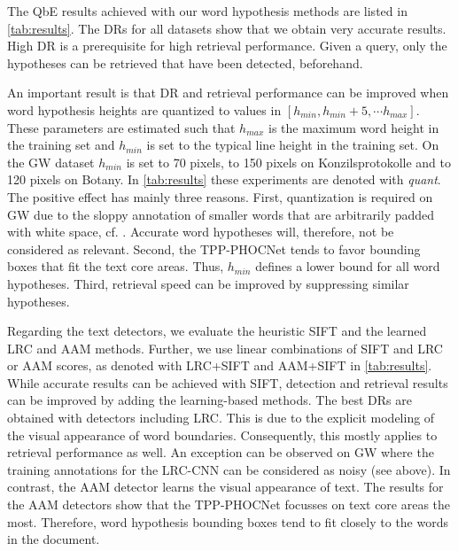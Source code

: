 The QbE results achieved with our word hypothesis methods are listed 
in \autoref{tab:results}. The DRs for all datasets show that we obtain very accurate
results.
High DR is a prerequisite for high retrieval performance. 
Given a query, only the hypotheses can be retrieved that have been detected, beforehand.

An important result is that DR and retrieval performance can be improved when word
hypothesis heights are quantized to values in $[h_{min}, h_{min}+5, \cdots h_{max}]$. 
These parameters are estimated such that
$h_{max}$ is the maximum word height in the training set and $h_{min}$ is set to the typical
line height in the training set.
On the GW dataset $h_{min}$ is set to 70 pixels, to 150 pixels on Konzilsprotokolle and to 120
pixels on Botany. 
In \autoref{tab:results} these experiments are denoted with \emph{quant}. 
The positive effect has mainly three reasons. 
First, quantization is required on GW due to the sloppy annotation of smaller words
that are arbitrarily padded with white space, cf. \cite{Wilkinson17}. Accurate word hypotheses
will, therefore, not be considered as relevant. 
Second, the TPP-PHOCNet tends to favor bounding boxes that fit the text core areas. Thus, $h_{min}$
defines a lower bound for all word hypotheses. Third, retrieval speed can be improved by
suppressing similar hypotheses.

Regarding the text detectors, we evaluate the heuristic SIFT and the learned LRC and AAM
methods.
Further, we use linear combinations of SIFT and LRC or AAM scores, as denoted with LRC+SIFT and
AAM+SIFT in \autoref{tab:results}. 
While accurate results can be achieved with SIFT, 
detection and retrieval results can be improved by adding the learning-based methods.
The best DRs are obtained with detectors including LRC. 
This is due to the explicit modeling of the visual appearance of 
word boundaries. Consequently, this mostly applies to retrieval performance as well. An
exception can be observed on GW where the training annotations for the LRC-CNN can be
considered as noisy (see above). In contrast, the AAM detector learns the visual appearance of
text. The results for the AAM detectors show that
the TPP-PHOCNet focusses on text core areas the most. Therefore, word hypothesis bounding boxes tend to fit 
closely to the words in the document.

